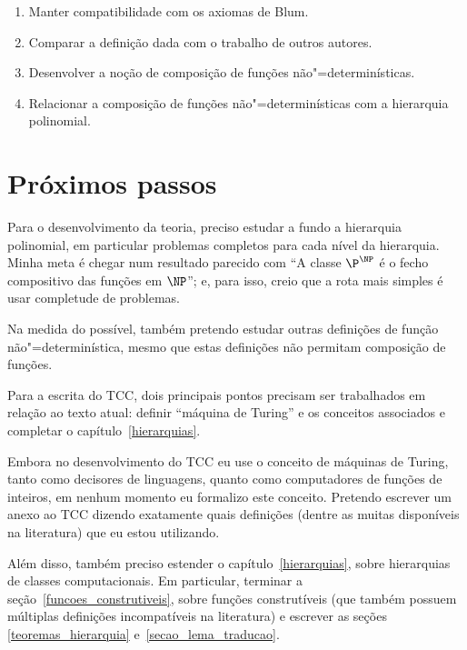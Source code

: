 \begin{enumerate}
    \item Manter compatibilidade com os axiomas de Blum.
    \item Comparar a definição dada com o trabalho de outros autores.
    \item Desenvolver a noção de composição de funções não"=determinísticas.
    \item Relacionar a composição de funções não"=determinísticas
        com a hierarquia polinomial.
\end{enumerate}

\section{Próximos passos}

Para o desenvolvimento da teoria,
preciso estudar a fundo a hierarquia polinomial,
em particular problemas completos para cada nível da hierarquia.
Minha meta é chegar num resultado parecido com
``A classe $\P^\NP$ é o fecho compositivo das funções em $\NP$'';
e, para isso,
creio que a rota mais simples é usar completude de problemas.

Na medida do possível,
também pretendo estudar outras definições de função não"=determinística,
mesmo que estas definições não permitam composição de funções.

Para a escrita do TCC,
dois principais pontos precisam ser trabalhados em relação ao texto atual:
definir ``máquina de Turing'' e os conceitos associados
e completar o capítulo~\ref{hierarquias}.

Embora no desenvolvimento do TCC eu use o conceito de máquinas de Turing,
tanto como decisores de linguagens,
quanto como computadores de funções de inteiros,
em nenhum momento eu formalizo este conceito.
Pretendo escrever um anexo ao TCC dizendo exatamente quais definições
(dentre as muitas disponíveis na literatura)
que eu estou utilizando.

Além disso, também preciso estender o capítulo~\ref{hierarquias},
sobre hierarquias de classes computacionais.
Em particular,
terminar a seção~\ref{funcoes_construtiveis},
sobre funções construtíveis
(que também possuem múltiplas definições incompatíveis na literatura)
e escrever as seções \ref{teoremas_hierarquia} e~\ref{secao_lema_traducao}.
